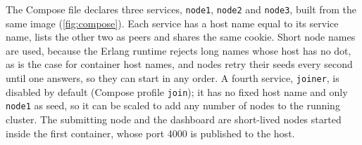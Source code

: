 \documentclass{scrartcl}
\begin{document}
The Compose file declares three services, \texttt{node1}, \texttt{node2} and \texttt{node3}, built from the same image (\cref{fig:compose}).
%
Each service has a host name equal to its service name, lists the other two as peers and shares the same cookie.
%
Short node names are used, because the Erlang runtime rejects long names whose host has no dot, as is the case for container host names, and nodes retry their seeds every second until one answers, so they can start in any order.
%
A fourth service, \texttt{joiner}, is disabled by default (Compose profile \texttt{join}); it has no fixed host name and only \texttt{node1} as seed, so it can be scaled to add any number of nodes to the running cluster.
%
The submitting node and the dashboard are short-lived nodes started inside the first container, whose port 4000 is published to the host.
\end{document}

